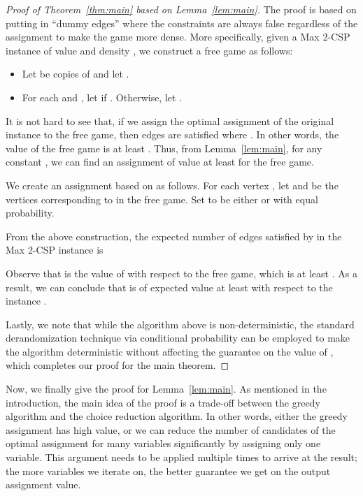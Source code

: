 \documentclass{article}
\begin{document}
\begin{proof}[Proof of Theorem~\ref{thm:main} based on Lemma~\ref{lem:main}]
  The proof is based on putting in ``dummy edges'' where the constraints are always false regardless of the assignment to make the game more dense. More specifically, given a {\sc Max 2-CSP} instance  of value  and density , we construct a free game  as follows:
  \begin{itemize}
    \item Let  be copies of  and let .
    \item For each  and , let  if . Otherwise, let .
  \end{itemize}

  It is not hard to see that, if we assign the optimal assignment of the original instance to the free game, then  edges are satisfied where . In other words, the value of the free game is at least . Thus, from Lemma~\ref{lem:main}, for any constant , we can find an assignment  of value at least  for the free game.

  We create an assignment  based on  as follows. For each vertex , let  and  be the vertices corresponding to  in the free game. Set  to be either  or  with equal probability.

  From the above construction, the expected number of edges satisfied by  in the {\sc Max 2-CSP} instance is
  

  Observe that  is the value of  with respect to the free game, which is at least . As a result, we can conclude that  is of expected value at least  with respect to the instance .

  Lastly, we note that while the algorithm above is non-deterministic, the standard derandomization technique via conditional probability can be employed to make the algorithm deterministic without affecting the guarantee on the value of , which completes our proof for the main theorem.
\end{proof}

Now, we finally give the proof for Lemma~\ref{lem:main}. As mentioned in the introduction, the main idea of the proof is a trade-off between the greedy algorithm and the choice reduction algorithm. In other words, either the greedy assignment has high value, or we can reduce the number of candidates of the optimal assignment for many variables significantly by assigning only one variable. This argument needs to be applied multiple times to arrive at the result; the more variables we iterate on, the better guarantee we get on the output assignment value.
\end{document}
